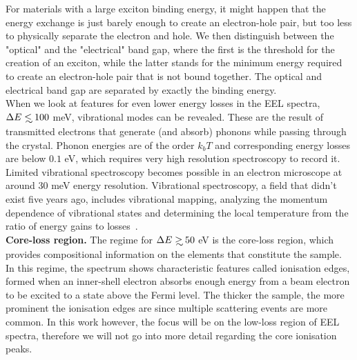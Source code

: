 For materials with a large exciton binding energy, it might happen that the energy exchange
is just barely enough to create an electron-hole pair, but too less to physically separate the electron and hole.
%
We then distinguish between the "optical" and the "electrical" band gap, where the first is the threshold
for the creation of an exciton, while the latter stands for the minimum energy required to create 
an electron-hole pair that is not bound together.
%
The optical and electrical band gap are separated by exactly the binding energy.\\

When we look at features for even lower energy losses in the EEL spectra, $\Delta E \lsim 100$ meV, 
vibrational modes can be revealed. 
%
These are the result of transmitted electrons that generate (and absorb) phonons 
while passing through the crystal. 
%
Phonon energies are of the order $k_bT$ and corresponding energy losses are below $0.1$ eV, 
which requires very high resolution spectroscopy to record it. 
%
Limited vibrational spectroscopy becomes possible in an electron microscope at around 30 meV 
energy resolution. 
%
Vibrational spectroscopy, a field that didn't exist five years ago, includes vibrational mapping, 
analyzing the momentum dependence of vibrational states and determining the local
temperature from the ratio of energy gains to losses~\cite{Krivanek:2009}.\\

{\bf Core-loss region.} The regime for $\Delta E \gsim 50$ eV is the core-loss region,
which provides compositional information
on the elements that constitute the sample. 
%
In this regime, the spectrum shows characteristic features called ionisation edges, 
formed when an inner-shell electron absorbs enough energy from a beam electron 
to be excited to a state above the Fermi level. 
%
The thicker the sample, the more prominent the ionisation edges are 
since multiple scattering events are more common. 
%
In this work however, the focus will be on the low-loss region of EEL spectra, 
therefore we will not go into more detail regarding the core ionisation peaks.



